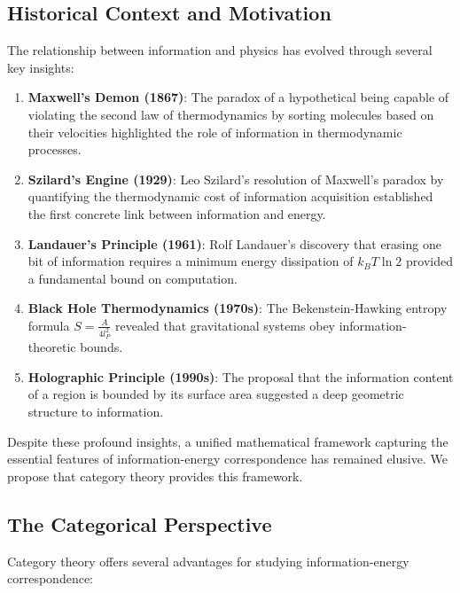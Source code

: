 \documentclass[12pt]{article}
\begin{document}
\subsection{Historical Context and Motivation}

The relationship between information and physics has evolved through several key insights:

\begin{enumerate}
\item \textbf{Maxwell's Demon (1867)}: The paradox of a hypothetical being capable of violating the second law of thermodynamics by sorting molecules based on their velocities highlighted the role of information in thermodynamic processes.

\item \textbf{Szilard's Engine (1929)}: Leo Szilard's resolution of Maxwell's paradox by quantifying the thermodynamic cost of information acquisition established the first concrete link between information and energy.

\item \textbf{Landauer's Principle (1961)}: Rolf Landauer's discovery that erasing one bit of information requires a minimum energy dissipation of $k_B T \ln 2$ provided a fundamental bound on computation.

\item \textbf{Black Hole Thermodynamics (1970s)}: The Bekenstein-Hawking entropy formula $S = \frac{A}{4l_P^2}$ revealed that gravitational systems obey information-theoretic bounds.

\item \textbf{Holographic Principle (1990s)}: The proposal that the information content of a region is bounded by its surface area suggested a deep geometric structure to information.
\end{enumerate}

Despite these profound insights, a unified mathematical framework capturing the essential features of information-energy correspondence has remained elusive. We propose that category theory provides this framework.

\subsection{The Categorical Perspective}

Category theory offers several advantages for studying information-energy correspondence:
\end{document}
